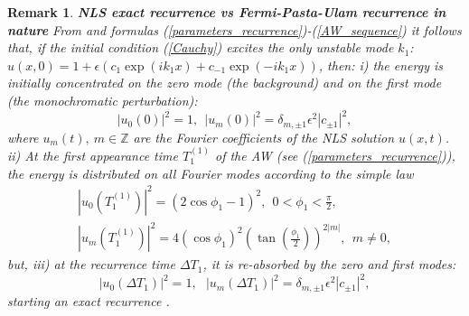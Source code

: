\documentclass[12pt]{article}
\newcommand{\ZZ}{{\mathbb Z}}
\newtheorem{remark}{Remark}
\newcommand{\beq}{\begin{equation}}
\newcommand{\eeq}{\end{equation}}
\newcommand{\ba}{\begin{array}}
\newcommand{\ea}{\end{array}}
\newcommand{\eps}{{\epsilon}}
\begin{document}
\begin{remark}
  {\bf NLS exact recurrence vs Fermi-Pasta-Ulam recurrence in nature} From \cite{GS1,GS2} and formulas (\ref{parameters_recurrence})-(\ref{AW_sequence}) it follows that, if the initial condition (\ref{Cauchy}) excites the only unstable mode $k_1$: $u(x,0)=1+\eps(c_1\exp(ik_1 x)+c_{-1}\exp(-ik_1 x))$, then: i) the energy is initially concentrated on the zero mode (the background) and on the first mode (the monochromatic perturbation):
  \beq
|u_0(0)|^2=1, \ \ |u_m(0)|^2=\delta_{m,\pm 1}\eps^2 |c_{\pm 1}|^2,
  \eeq
where $u_m(t),~m\in\ZZ$ are the Fourier coefficients of the NLS solution $u(x,t)$. ii) At the first appearance time $T^{(1)}_1$ of the AW (see (\ref{parameters_recurrence})), the energy is distributed on all Fourier modes according to the simple law
\beq
\ba{l}
|u_0(T^{(1)}_1)|^2=(2\cos\phi_1 -1)^2, \ \ 0<\phi_1 <\frac{\pi}{2}, \\ |u_m(T^{(1)}_1)|^2=4(\cos\phi_1)^2\left(\tan\left(\frac{\phi_1}{2} \right) \right)^{2|m|}, \ \ m\ne 0,
\ea
\eeq
  but, iii) at the recurrence time $\Delta T_1$, it is re-absorbed by the zero and first modes:
  \beq
|u_0(\Delta T_1)|^2=1, \ \ \ |u_m(\Delta T_1)|^2=\delta_{m,\pm 1}\eps^2 |c_{\pm 1}|^2,
  \eeq
  starting an exact recurrence \cite{GS5}.
  

\end{remark}
\end{document}
